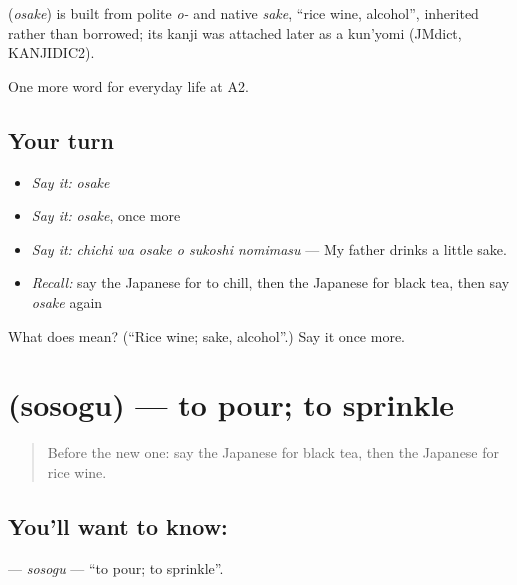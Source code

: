 \begin{cousinweb}
\textbf{} (\emph{osake}) is built from polite \emph{o-} and native \emph{sake}, \textquotedblleft{}rice wine, alcohol\textquotedblright{}, inherited rather than borrowed; its kanji was attached later as a kun'yomi (JMdict, KANJIDIC2).
\end{cousinweb}

\begin{grammarlens}[title={What you've built}]
One more word for everyday life at A2.
\end{grammarlens}

\subsection*{Your turn}
\begin{itemize}
\raggedright
  \item \emph{Say it:} \emph{osake}
  \item \emph{Say it:} \emph{osake}, once more
  \item \emph{Say it:} \emph{chichi wa osake o sukoshi nomimasu} — My father drinks a little sake.
  \item \emph{Recall:} say the Japanese for to chill, then the Japanese for black tea, then say \emph{osake} again
\end{itemize}

\begin{tcolorbox}[breakable,colback=teal!4,colframe=teal!35!black,title={Before you move on}]
What does  mean? (\textquotedblleft{}Rice wine; sake, alcohol\textquotedblright{}.) Say it once more.
\end{tcolorbox}
\section[\texorpdfstring{\ja{そそぐ} (sosogu)}{そそぐ (sosogu)}]{ (sosogu) — to pour; to sprinkle}

\label{lesson:JA-C179-sosogu}



\begin{quote}
Before the new one: say the Japanese for black tea, then the Japanese for rice wine.
\end{quote}

\subsection*{You'll want to know: }
\textbf{} — \emph{sosogu} — \textquotedblleft{}to pour; to sprinkle\textquotedblright{}.

